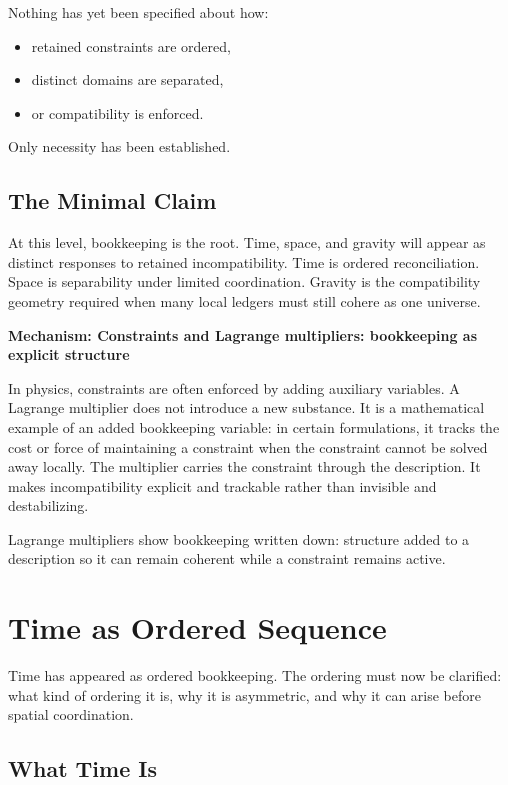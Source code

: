 \documentclass[11pt,twoside,openright]{book}
\newenvironment{mechanismbox}[1]
  {\begin{framed}\noindent\textbf{Mechanism: #1}\par\medskip}
  {\end{framed}}
\begin{document}
Nothing has yet been specified about how:

\begin{itemize}
\item retained constraints are ordered,
\item distinct domains are separated,
\item or compatibility is enforced.
\end{itemize}

Only necessity has been established.

\section*{The Minimal Claim}

At this level, bookkeeping is the root. Time, space, and gravity will appear as distinct responses to retained incompatibility. Time is ordered reconciliation. Space is separability under limited coordination. Gravity is the compatibility geometry required when many local ledgers must still cohere as one universe.

\begin{mechanismbox}{Constraints and Lagrange multipliers: bookkeeping as explicit structure}

In physics, constraints are often enforced by adding auxiliary variables. A Lagrange multiplier does not introduce a new substance. It is a mathematical example of an added bookkeeping variable: in certain formulations, it tracks the cost or force of maintaining a constraint when the constraint cannot be solved away locally. The multiplier carries the constraint through the description. It makes incompatibility explicit and trackable rather than invisible and destabilizing.

Lagrange multipliers show bookkeeping written down: structure added to a description so it can remain coherent while a constraint remains active.

\end{mechanismbox}
\chapter{Time as Ordered Sequence}

Time has appeared as ordered bookkeeping. The ordering must now be clarified: what kind of ordering it is, why it is asymmetric, and why it can arise before spatial coordination.

\section*{What Time Is}
\end{document}
